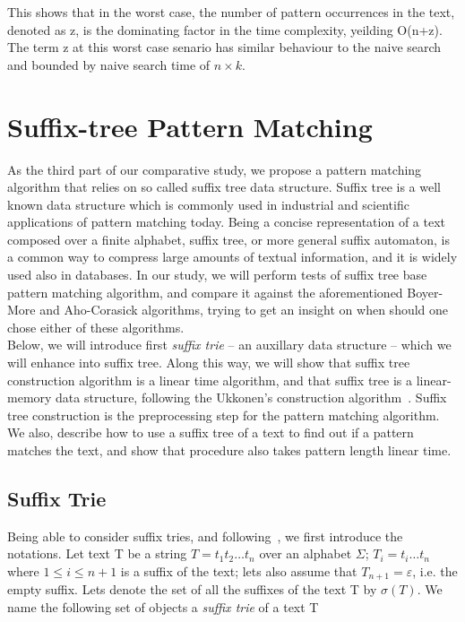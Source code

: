 \documentclass[paper=a4, fontsize=11pt]{scrartcl} %
\numberwithin{equation}{section} %
\numberwithin{figure}{section} %
\numberwithin{table}{section} %
\begin{document}
This shows that in the worst case, the number of pattern occurrences in the text, denoted as z, is the dominating factor in the time complexity, yeilding O(n+z). The term z at this worst case senario has similar behaviour to the naive search and bounded by naive search time of $n \times k$. 


\newpage

\section{Suffix-tree Pattern Matching}
As the third part of our comparative study, we propose a pattern matching algorithm that relies on so called suffix tree data structure. Suffix tree is a well known data structure which is commonly used in industrial and scientific applications of pattern matching today. Being a concise representation of a text composed over a finite alphabet, suffix tree, or more general suffix automaton, is a common way to compress large amounts of textual information, and it is widely used also in databases. In our study, we will perform tests of suffix tree base pattern matching algorithm, and compare it against the aforementioned Boyer-More and Aho-Corasick algorithms, trying to get an insight on when should one chose either of these algorithms.\\

Below, we will introduce first \textit{suffix trie} -- an auxillary data structure -- which we will enhance into suffix tree. Along this way, we will show that suffix tree construction algorithm is a linear time algorithm, and that suffix tree is a linear-memory data structure, following the Ukkonen's construction algorithm~\cite{ukkonen1995online}. Suffix tree construction is the preprocessing step for the pattern matching algorithm. We also, describe how to use a suffix tree of a text to find out if a pattern matches the text, and show that procedure also takes pattern length linear time.

\subsection{Suffix Trie}
Being able to consider suffix tries, and following~\cite{ukkonen1995online}, we first introduce the notations. Let text T be a string $T = t_1 t_2 \dots t_n$ over an alphabet $\Sigma$; $T_i = t_i \dots t_n$ where $1 \leq i \leq n+1$ is a suffix of the text; lets also assume that $T_{n+1} = \varepsilon$, i.e. the empty suffix. Lets denote the set of all the suffixes of the text T by $\sigma(T)$. We name the following set of objects a \textit{suffix trie} of a text T
\end{document}
